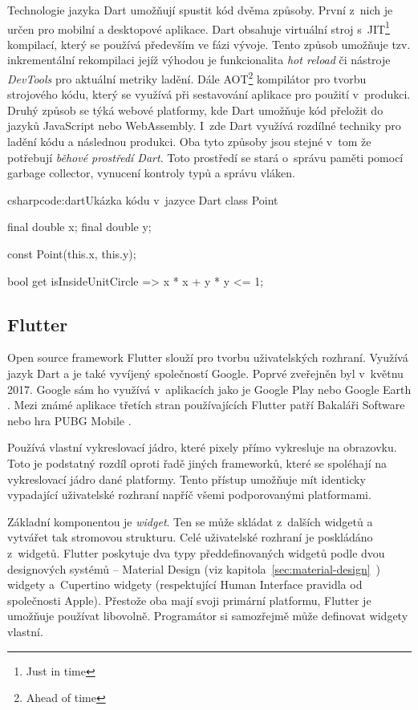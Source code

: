 \documentclass[
  biblatex,
  figures=true,
  tables=false,
  glossaries,
  index
]{kidiplom}
\begin{document}
Technologie jazyka Dart umožňují spustit kód dvěma způsoby. První z~nich je určen pro mobilní a desktopové aplikace. Dart obsahuje virtuální stroj s~JIT\footnote{Just in time} kompilací, který se používá především ve fázi vývoje. Tento způsob umožňuje tzv. inkrementální rekompilaci jejíž výhodou je funkcionalita \textit{hot reload} či nástroje \textit{DevTools} pro aktuální metriky ladění. Dále AOT\footnote{Ahead of time} kompilátor pro tvorbu strojového kódu, který se využívá při sestavování aplikace pro použití v~produkci. Druhý způsob se týká webové platformy, kde Dart umožňuje kód přeložit do jazyků JavaScript nebo WebAssembly. I~zde Dart využívá rozdílné techniky pro ladění kódu a následnou produkci. Oba tyto způsoby jsou stejné v~tom že potřebují \textit{běhové prostředí Dart}. Toto prostředí se stará o~správu paměti pomocí garbage collector, vynucení kontroly typů a správu vláken.

\begin{kicode}{csharp}{code:dart}{Ukázka kódu v~jazyce Dart}
class Point {
  final double x;
  final double y;

  const Point(this.x, this.y);

  bool get isInsideUnitCircle => x * x + y * y <= 1;
}
\label{code:dart}
\end{kicode}

\subsection{Flutter}
Open source framework Flutter \cite{flutter} slouží pro tvorbu uživatelských rozhraní. Využívá jazyk Dart a je také vyvíjený společností Google. Poprvé zveřejněn byl v~květnu 2017. Google sám ho využívá v~aplikacích jako je Google Play nebo Google Earth \cite{flutter-showcase}. Mezi známé aplikace třetích stran používajících Flutter patří Bakaláři Software nebo hra PUBG Mobile \cite{flutter-showcase}.

Používá vlastní vykreslovací jádro, které pixely přímo vykresluje na obrazovku. Toto je podstatný rozdíl oproti řadě jiných frameworků, které se spoléhají na vykreslovací jádro dané platformy. Tento přístup umožňuje mít identicky vypadající uživatelské rozhraní napříč všemi podporovanými platformami.

Základní komponentou je \textit{widget}. Ten se může skládat z~dalších widgetů a vytvářet tak stromovou strukturu. Celé uživatelské rozhraní je poskládáno z~widgetů. Flutter poskytuje dva typy předdefinovaných widgetů podle dvou designových systémů -- Material Design (viz kapitola~\ref{sec:material-design}~) widgety a~Cupertino widgety (respektující Human Interface pravidla \cite{human-interface} od společnosti Apple). Přestože oba mají svoji primární platformu, Flutter je umožňuje používat libovolně. Programátor si samozřejmě může definovat widgety vlastní.
\end{document}
